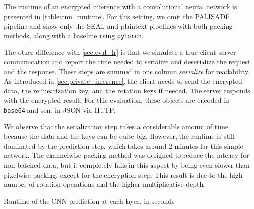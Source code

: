 \documentclass[a4paper,11pt,oneside]{report}
\begin{document}
The runtime of an encrypted inference with a convolutional neural network is presented in \autoref{table:cnn_runtime}. 
For this setting, we omit the PALISADE pipeline and show only the SEAL and plaintext pipelines with both packing methods, along with a baseline using \texttt{pytorch}.

The other difference with \autoref{sec:eval_lr} is that we simulate a true client-server communication and report the time needed to serialize and deserialize the request and the response.
These steps are summed in one column \emph{serialize} for readability.
As introduced in \autoref{sec:private_inference}, the client needs to send the encrypted data, the relinearization key, and the rotation keys if needed.
The server responds with the encrypted result.
For this evaluation, these objects are encoded in \texttt{base64} and sent in JSON via HTTP.

We observe that the serialization step takes a considerable amount of time because the data and the keys can be quite big. 
However, the runtime is still dominated by the prediction step, which takes around 2 minutes for this simple network.
The channelwise packing method was designed to reduce the latency for non-batched data, but it completely fails in this aspect by being even slower than pixelwise packing, except for the encryption step.
This result is due to the high number of rotation operations and the higher multiplicative depth.

\begin{table}[h!]
  \begin{center}
    \caption{Runtime of the CNN prediction at each layer, in seconds}
    \label{table:cnn_layers}
    \vspace*{2mm}
  \end{center}
\end{table}
\end{document}
